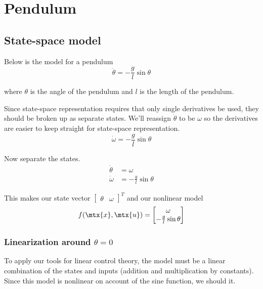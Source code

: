 \section{Pendulum}

\subsection{State-space model}

Below is the \gls{model} for a pendulum
\begin{equation*}
  \ddot{\theta} = -\frac{g}{l}\sin\theta
\end{equation*}

where $\theta$ is the angle of the pendulum and $l$ is the length of the
pendulum.

Since state-space representation requires that only single derivatives be used,
they should be broken up as separate \glspl{state}. We'll reassign
$\dot{\theta}$ to be $\omega$ so the derivatives are easier to keep straight for
state-space representation.
\begin{equation*}
  \dot{\omega} = -\frac{g}{l}\sin\theta
\end{equation*}

Now separate the \glspl{state}.
\begin{align*}
  \dot{\theta} &= \omega \\
  \dot{\omega} &= -\frac{g}{l} \sin\theta
\end{align*}

This makes our state vector $\begin{bmatrix}\theta & \omega\end{bmatrix}^T$ and
our nonlinear model
\begin{equation*}
  f(\mtx{x}, \mtx{u}) =
  \begin{bmatrix}
    \omega \\
    -\frac{g}{l}\sin\theta
  \end{bmatrix}
\end{equation*}

\subsubsection{Linearization around $\theta = 0$}

To apply our tools for linear control theory, the \gls{model} must be a linear
combination of the \glspl{state} and \glspl{input} (addition and multiplication
by constants). Since this \gls{model} is nonlinear on account of the sine
function, we should 
 it.

